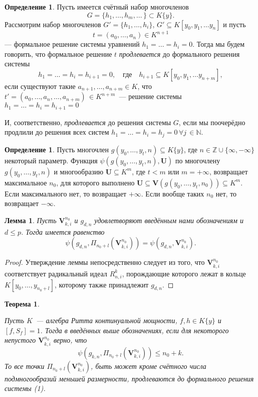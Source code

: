 \documentclass[16pt]{article}
\theoremstyle{plain1}
\newtheorem{lemma}[theorem1]{Лемма}
\theoremstyle{plain2}
\theoremstyle{plain}
\newtheorem{theorem}{Теорема}
\theoremstyle{plain3}
\theoremstyle{definition}
\newtheorem{definition}[theorem2]{Определение}
\theoremstyle{remark}
\begin{document}
\begin{definition}
Пусть имеется счётный набор многочленов
$$
G=\{h_1,\ldots,h_m,\ldots\,\}\subset K\{y\}.
$$
Рассмотрим набор многочленов $G'=\{h_1,\ldots,h_i\}$, $G'\subseteq K[y_0,y_1,\ldots
y_n]$ и пусть
$$
t=(a_0,\ldots,a_n)\in K^{n+1}
$$
--- формальное решение системы уравнений $h_1=\ldots=h_i=0$. Тогда мы будем говорить, что формальное решение
$t$ \emph{продлевается} до формального решения системы
$$
h_1=\ldots=h_i=h_{i+1}=0, \quad\mbox{где}\quad h_{i+1}\subseteq K[y_0,y_1,\ldots
y_{n+m}],
$$
если существуют такие $a_{n+1},\ldots, a_{n+m}\in K$, что
$t'=(a_0,\ldots,a_n,\ldots,a_{n+m})\,\in K^{n+m}$~--- решение
системы $h_1=\ldots=h_i=h_{i+1}=0$

И, соответственно, \emph{продлевается} до решения системы $G$, если
мы поочерёдно продлили до решения всех систем $h_1=\ldots=h_i=h_{j}=0\, \forall j\,\in \mathbb{N}$.
\end{definition}



\begin{definition}
Пусть многочлен $g(y_0,\ldots,y_t,n)\subseteq K\{y\}$, где $n\in \mathbb{Z}\cup\{\infty,-\infty\}$ некоторый параметр. Функция $\psi(g(y_0,\ldots,y_t,n),\mathbf{U})$ по многочлену $g(y_0,\ldots,y_t,n)$ и  многообразию $\mathbf{U}\subseteq K^m$, где $t< m$ или $m=+\infty$, возвращает максимальное $n_0$, для которого выполнено $\mathbf{U}\subseteq \mathbf{V}(g(y_0,\ldots,y_t,n_0))\subseteq K^m$. Если максимального нет, то возвращает $+\infty$. Если вообще таких  $n_0$ нет, то возвращает $-\infty$.
\end{definition}

\begin{lemma}\label{lemma:o_ravenste_psi}
Пусть $\mathbf{V}_{k,i}^{n_0}$ и $g_{d,n}$ удовлетворяют введённым нами обозначениям и  $d\leqslant p$. Тогда имеется равенство $$\psi(g_{d,n},\Pi_{n_0+l}(\mathbf{V}_{k,i}^{n_0}))=\psi(g_{d,n},\mathbf{V}_{k,i}^{n_0}).$$
\end{lemma}

\begin{proof}
Утверждение леммы непосредственно следует из того, что $\mathbf{V}_{k,i}^{n_0}$ соответствует радикальный идеал $R_{n,i}^k$, порождающие которого лежат в кольце $K[y_0,\ldots,y_{n_0+l}]$, которому также принадлежит $g_{d,n}$.
\end{proof}


\begin{theorem}\label{theorem:general th1}

Пусть $K$~--- алгебра Ритта континуальной мощности, $f,h\in K\{y\}$ и $[f,S_f]=1$. Тогда в введённых выше обозначениях, если для некоторого непустого $\mathbf{V}_{k,i}^{n_0}$ верно, что
\begin{equation}
\psi(g_{k,n},\Pi_{n_0+l}(\mathbf{V}_{k,i}^{n_0}))\leqslant n_0+k.
\end{equation}
То все точки $\Pi_{n_0+l}(\mathbf{V}_{k,i}^{n_0})$, быть может кроме счётного числа подмногообразий меньшей размерности, продлеваются до формального решения системы (1).
\end{theorem}
\end{document}
